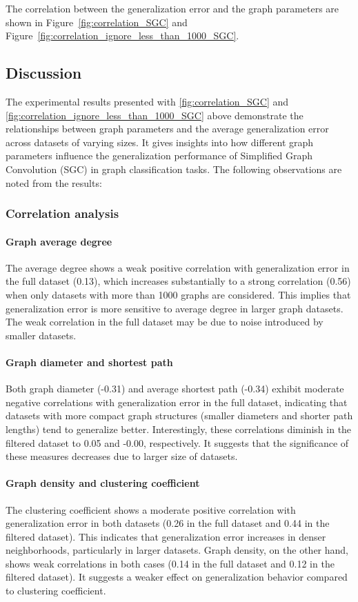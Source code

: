 The correlation between the generalization error and the graph parameters are shown in Figure~\ref{fig:correlation_SGC} and Figure~\ref{fig:correlation_ignore_less_than_1000_SGC}.


\subsection{Discussion}

The experimental results presented with \ref{fig:correlation_SGC} and \ref{fig:correlation_ignore_less_than_1000_SGC}  above demonstrate the relationships between graph parameters and the average generalization error across datasets of varying sizes. It gives insights into how different graph parameters influence the generalization performance of Simplified Graph Convolution (SGC) in graph classification tasks. The following observations are noted from the results:

\subsubsection{Correlation analysis}

\paragraph{Graph average degree}
The average degree shows a weak positive correlation with generalization error in the full dataset (0.13), which increases substantially to a strong correlation (0.56) when only datasets with more than 1000 graphs are considered. This implies that generalization error is more sensitive to average degree in larger graph datasets. The weak correlation in the full dataset may be due to noise introduced by smaller datasets.

\paragraph{Graph diameter and shortest path}
Both graph diameter (-0.31) and average shortest path (-0.34) exhibit moderate negative correlations with generalization error in the full dataset, indicating that datasets with more compact graph structures (smaller diameters and shorter path lengths) tend to generalize better. Interestingly, these correlations diminish in the filtered dataset to 0.05 and -0.00, respectively. It suggests that the significance of these measures decreases due to larger size of datasets. 

\paragraph{Graph density and clustering coefficient}
The clustering coefficient shows a moderate positive correlation with generalization error in both datasets (0.26 in the full dataset and 0.44 in the filtered dataset). This indicates that generalization error increases in denser neighborhoods, particularly in larger datasets. Graph density, on the other hand, shows weak correlations in both cases (0.14 in the full dataset and 0.12 in the filtered dataset). It suggests a weaker effect on generalization behavior compared to clustering coefficient.

